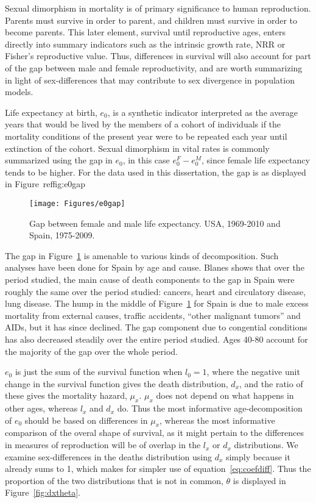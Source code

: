  \FloatBarrier
Sexual dimorphism in mortality is of primary significance to human reproduction.
Parents must survive in order to parent, and children must survive in order to
become parents. This later element, survival until reproductive ages, enters
directly into summary indicators such as the intrinsic growth rate, NRR or
Fisher's reproductive value. Thus, differences in survival will also account for
part of the gap between male and female reproductivity, and are worth summarizing in light of sex-differences
that may contribute to sex divergence in population models.

Life expectancy at birth, $e_0$, is a synthetic indicator interpreted as the
average years that would be lived by the members of a cohort of individuals if
the mortality conditions of the present year were to be repeated each year until extinction of
the cohort. Sexual dimorphism in vital rates is commonly summarized using the
gap in $e_0$, in this case $e_0^F - e_0^M$, since female life expectancy tends
to be higher. For the data used in this dissertation, the gap is as displayed in
Figure~ref{fig:e0gap}

\begin{figure}[!ht]
  \centering
    \caption{Gap between female and male life expectancy. USA,
    1969-2010 and Spain, 1975-2009.}
     \texttt{[image: Figures/e0gap]}
     \label{fig:e0gap}
\end{figure}

The gap in Figure~\ref{fig:e0gap} is amenable to various kinds of decomposition.
Such analyses have been done for Spain by age and cause\citep[pp 217-218 and
447]{amand2007thesis}. Blanes shows that over the period studied, the main cause of death components to the
gap in Spain were roughly the same over the period studied: cancers, heart
and circulatory disease, lung disease. The hump in the middle of
Figure~\ref{fig:e0gap} for Spain is due to male excess mortality from external
causes, traffic accidents, ``other malignant tumors'' and AIDs, but it has
since declined. The gap component due to congential conditions has also
decreased steadily over the entire period studied. Ages 40-80 account for the
majority of the gap over the whole period.


$e_0$ is just the sum of the survival function when $l_0 = 1$, where the
negative unit change in the survival function gives the death distribution,
$d_x$, and the ratio of these gives the mortality hazard, $\mu _x$. $\mu_x$ does
not depend on what happens in other ages, whereas $l_x$ and $d_x$ do. Thus the
most informative age-decomposition of $e_0$ should be based on differences in
$\mu _x$, whereas the most informative comparison of the overal shape of
survival, as it might pertain to the differences in measures of reproduction
will be of overlap in the $l_x$ or $d_x$ distributions. We examine
sex-differences in the deaths distribution using $d_x$ simply
because it already sums to 1, which makes for simpler use of
equation~\eqref{eq:coefdiff}. Thus the proportion of the two distributions that
is not in common, $\theta$ is displayed in Figure~\ref{fig:dxtheta}.

